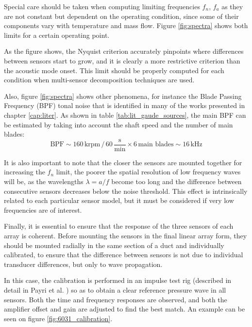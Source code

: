 Special care should be taken when computing limiting frequencies $f_n$, $f_a$ as they are not constant but dependent on the operating condition, since some of their components vary with temperature and mass flow. Figure \ref{fig:spectra} shows both limits for a certain operating point.

As the figure shows, the Nyquist criterion accurately pinpoints where differences between sensors start to grow, and it is clearly a more restrictive criterion than the acoustic mode onset. This limit should be properly computed for each condition when multi-sensor decomposition techniques are used.

Also, figure \ref{fig:spectra} shows other phenomena, for instance the Blade Passing Frequency (BPF) tonal noise that is identified in many of the works presented in chapter \ref{cap:liter}. As shown in table \ref{tab:lit_gaude_sources}, the main BPF can be estimated by taking into account the shaft speed and the number of main blades:
\begin{equation}
  \text{BPF} \sim 160\,\text{krpm}\,/\,60\,\frac{\text{s}}{\text{min}} \times 6\,\text{main blades} \sim 16\,\text{kHz}
\end{equation}

It is also important to note that the closer the sensors are mounted together for increasing the $f_n$ limit, the poorer the spatial resolution of low frequency waves will be, as the wavelengths $\lambda=a/f$ become too long and the difference between consecutive sensors decreases below the noise threshold. This effect is intrinsically related to each particular sensor model, but it must be considered if very low frequencies are of interest.

Finally, it is essential to ensure that the response of the three sensors of each array is coherent. Before mounting the sensors in the final linear array form, they should be mounted radially in the same section of a duct and individually calibrated, to ensure that the difference between sensors is not due to individual transducer differences, but only to wave propagation.

In this case, the calibration is performed in an impulse test rig (described in detail in Payri et al. \cite{payri2000modified}) so as to obtain a clear reference pressure wave in all sensors. Both the time and frequency responses are observed, and both the amplifier offset and gain are adjusted to find the best match. An example can be seen on figure \ref{fig:6031_calibration}.

